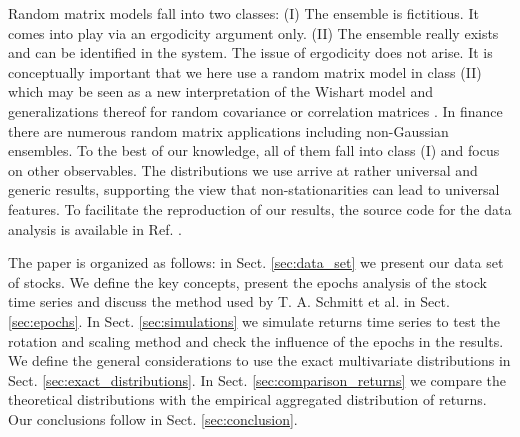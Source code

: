 Random matrix models \cite{random_matrix_1,random_matrix_2} fall into two
classes: (I) The ensemble is fictitious. It comes into play via an ergodicity
argument only. (II) The ensemble really exists and can be identified in the
system. The issue of ergodicity does not arise. It is conceptually important
that we here use a random matrix model in class (II) which may be seen as a new
interpretation of the Wishart model and generalizations thereof for random
covariance or correlation matrices \cite{wishart}. In finance there are
numerous random matrix applications
\cite{matrix_fin_01,matrix_fin_02,matrix_fin_03,matrix_fin_04,matrix_fin_05,matrix_fin_06,matrix_fin_07,matrix_fin_08,matrix_fin_09,matrix_fin_10,matrix_fin_11,matrix_fin_12,matrix_fin_13}
including non-Gaussian ensembles. To the best of our knowledge, all of them
fall into class (I) and focus on other observables. The distributions we use
arrive at rather universal and generic results, supporting the view that
non-stationarities can lead to universal features. To facilitate the
reproduction of our results, the source code for the data analysis is available
in Ref. \cite{code}.

The paper is organized as follows: in Sect. \ref{sec:data_set} we present our
data set of stocks. We define the key concepts, present the epochs analysis of
the stock time series and discuss the method used by T. A. Schmitt et al.
\cite{non_stationarity_fin_guhr} in Sect. \ref{sec:epochs}. In Sect.
\ref{sec:simulations} we simulate returns time series to test the rotation and
scaling method and check the influence of the epochs in the results. We define
the general considerations to use the exact multivariate distributions in Sect.
\ref{sec:exact_distributions}. In Sect. \ref{sec:comparison_returns} we compare
the theoretical distributions with the empirical aggregated distribution of
returns. Our conclusions follow in Sect. \ref{sec:conclusion}.